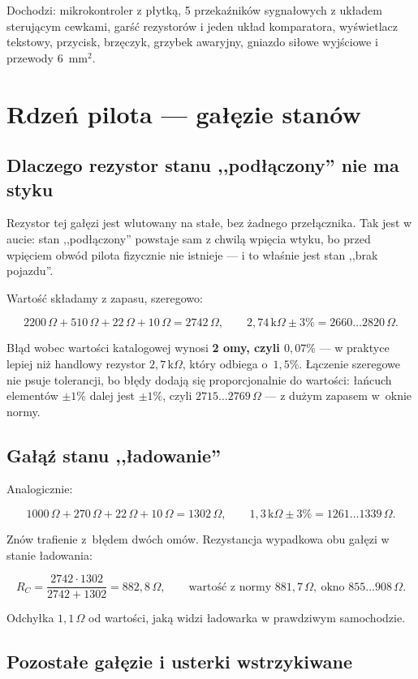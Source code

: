 \documentclass[a4paper,11pt]{article}
\newcommand{\ohm}{\,\Omega}
\newcommand{\kohm}{\,\mathrm{k}\Omega}
\begin{document}
\noindent Dochodzi: mikrokontroler z płytką, 5 przekaźników sygnałowych z układem
sterującym cewkami, garść rezystorów i jeden układ komparatora, wyświetlacz
tekstowy, przycisk, brzęczyk, grzybek awaryjny, gniazdo siłowe wyjściowe i przewody
$6$~mm$^2$.

\section{Rdzeń pilota --- gałęzie stanów}
\label{sec:rdzen}

\subsection{Dlaczego rezystor stanu ,,podłączony'' nie ma styku}

Rezystor tej gałęzi jest wlutowany na stałe, bez żadnego przełącznika. Tak jest
w aucie: stan ,,podłączony'' powstaje sam z chwilą wpięcia wtyku, bo przed wpięciem
obwód pilota fizycznie nie istnieje --- i to właśnie jest stan ,,brak pojazdu''.

Wartość składamy z zapasu, szeregowo:

\[
2200\ohm+510\ohm+22\ohm+10\ohm=2742\ohm ,
\qquad
2{,}74\kohm\pm3\%=2660\ldots2820\ohm .
\]

Błąd wobec wartości katalogowej wynosi \textbf{2 omy, czyli $0{,}07\%$} --- w praktyce
lepiej niż handlowy rezystor $2{,}7\kohm$, który odbiega o~$1{,}5\%$. Łączenie szeregowe
nie psuje tolerancji, bo błędy dodają się proporcjonalnie do wartości: łańcuch
elementów $\pm1\%$ dalej jest $\pm1\%$, czyli $2715\ldots2769\ohm$ --- z dużym zapasem
w~oknie normy.

\subsection{Gałąź stanu ,,ładowanie''}

Analogicznie:

\[
1000\ohm+270\ohm+22\ohm+10\ohm=1302\ohm ,
\qquad
1{,}3\kohm\pm3\%=1261\ldots1339\ohm .
\]

Znów trafienie z~błędem dwóch omów. Rezystancja wypadkowa obu gałęzi w stanie
ładowania:

\[
R_C=\frac{2742\cdot1302}{2742+1302}=882{,}8\ohm ,
\qquad
\text{wartość z normy } 881{,}7\ohm,\ \text{okno } 855\ldots908\ohm .
\]

Odchyłka $1{,}1\ohm$ od wartości, jaką widzi ładowarka w prawdziwym samochodzie.

\subsection{Pozostałe gałęzie i usterki wstrzykiwane}
\end{document}
